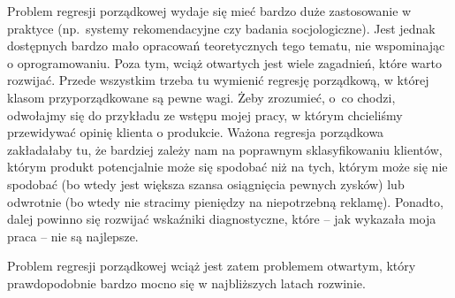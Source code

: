 \documentclass{mini}
\begin{document}
Problem regresji porządkowej wydaje się mieć bardzo duże zastosowanie w praktyce (np.~systemy rekomendacyjne czy badania socjologiczne). Jest jednak dostępnych bardzo mało opracowań teoretycznych tego tematu, nie wspominając o oprogramowaniu. Poza tym, wciąż otwartych jest wiele zagadnień, które warto rozwijać. Przede wszystkim trzeba tu wymienić regresję porządkową, w której klasom przyporządkowane są pewne wagi. Żeby zrozumieć, o~co chodzi, odwołajmy się do przykładu ze wstępu mojej pracy, w którym chcieliśmy przewidywać opinię klienta o produkcie. Ważona regresja porządkowa zakładałaby tu, że bardziej zależy nam na poprawnym sklasyfikowaniu klientów, którym produkt potencjalnie może się spodobać niż na tych, którym może się nie spodobać (bo wtedy jest większa szansa osiągnięcia pewnych zysków) lub odwrotnie (bo wtedy nie stracimy pieniędzy na niepotrzebną reklamę). Ponadto, dalej powinno się rozwijać wskaźniki diagnostyczne, które -- jak wykazała moja praca -- nie są najlepsze. 

Problem regresji porządkowej wciąż jest zatem problemem otwartym, który prawdopodobnie bardzo mocno się w najbliższych latach rozwinie. 


\end{document}
